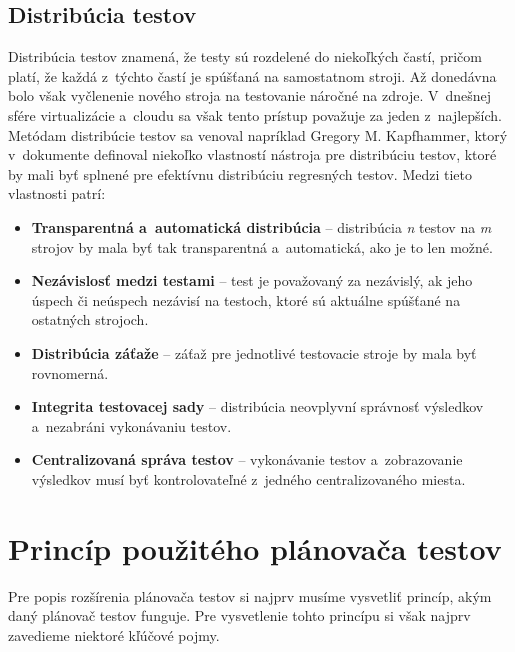 \subsection*{Distribúcia testov}
Distribúcia testov znamená, že testy sú rozdelené do niekoľkých častí,
pričom platí, že každá z~týchto častí je spúšťaná na samostatnom stroji.
Až donedávna bolo však vyčlenenie nového stroja na testovanie náročné 
na zdroje. V~dnešnej sfére virtualizácie a~cloudu sa však tento prístup 
považuje za jeden z~najlepších. 
Metódam distribúcie testov sa venoval napríklad Gregory M. Kapfhammer, 
ktorý v~dokumente \cite{Kapfhammer} definoval niekoľko vlastností nástroja 
pre distribúciu testov, ktoré by mali byť splnené pre efektívnu 
distribúciu regresných testov. Medzi tieto vlastnosti patrí:
\begin{itemize}
\item \textbf{Transparentná a~automatická distribúcia} -- distribúcia 
\emph{n} testov na \emph{m} strojov by mala byť tak transparentná 
a~automatická, ako je to len možné.
\item \textbf{Nezávislosť medzi testami} -- test je považovaný za 
nezávislý, ak jeho úspech či neúspech nezávisí na testoch, ktoré sú 
aktuálne spúšťané na ostatných strojoch. 
\item \textbf{Distribúcia záťaže} -- záťaž pre jednotlivé testovacie 
stroje by mala byť rovnomerná.
\item \textbf{Integrita testovacej sady} -- distribúcia neovplyvní 
správnosť výsledkov a~nezabráni vykonávaniu testov.
\item \textbf{Centralizovaná správa testov} -- vykonávanie testov 
a~zobrazovanie výsledkov musí byť kontrolovateľné z~jedného 
centralizovaného miesta.
\end{itemize}




\section{Princíp použitého plánovača testov} 
\label{sekcia:princip_pouziteho_planovaca}
Pre popis rozšírenia plánovača testov si najprv musíme vysvetliť princíp, 
akým daný plánovač testov funguje. Pre vysvetlenie tohto princípu si 
však najprv zavedieme niektoré kľúčové pojmy.

